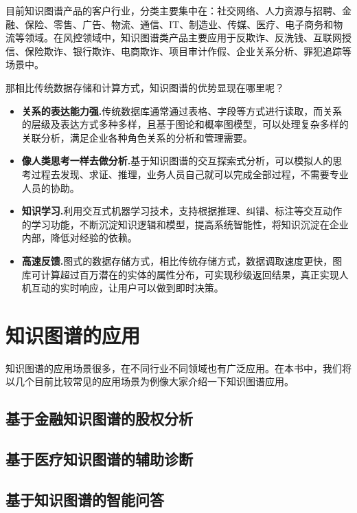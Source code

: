目前知识图谱产品的客户行业，分类主要集中在：社交网络、人力资源与招聘、金融、保险、零售、广告、物流、通信、IT、制造业、传媒、医疗、电子商务和物流等领域。在风控领域中，知识图谱类产品主要应用于反欺诈、反洗钱、互联网授信、保险欺诈、银行欺诈、电商欺诈、项目审计作假、企业关系分析、罪犯追踪等场景中。

那相比传统数据存储和计算方式，知识图谱的优势显现在哪里呢？

\begin{itemize}
  \item \textbf{关系的表达能力强.}传统数据库通常通过表格、字段等方式进行读取，而关系的层级及表达方式多种多样，且基于图论和概率图模型，可以处理复杂多样的关联分析，满足企业各种角色关系的分析和管理需要。
  \item \textbf{像人类思考一样去做分析.}基于知识图谱的交互探索式分析，可以模拟人的思考过程去发现、求证、推理，业务人员自己就可以完成全部过程，不需要专业人员的协助。
  \item \textbf{知识学习.}利用交互式机器学习技术，支持根据推理、纠错、标注等交互动作的学习功能，不断沉淀知识逻辑和模型，提高系统智能性，将知识沉淀在企业内部，降低对经验的依赖。
  \item \textbf{高速反馈.}图式的数据存储方式，相比传统存储方式，数据调取速度更快，图库可计算超过百万潜在的实体的属性分布，可实现秒级返回结果，真正实现人机互动的实时响应，让用户可以做到即时决策。
\end{itemize}



\section{知识图谱的应用}
知识图谱的应用场景很多，在不同行业不同领域也有广泛应用。在本书中，我们将以几个目前比较常见的应用场景为例像大家介绍一下知识图谱应用。

\subsection{基于金融知识图谱的股权分析}

\subsection{基于医疗知识图谱的辅助诊断}


\subsection{基于知识图谱的智能问答}